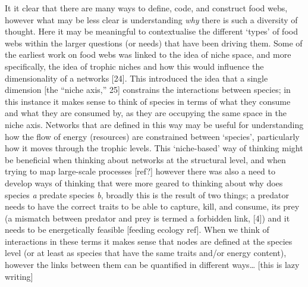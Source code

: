 \documentclass[
]{article}
\begin{document}
It it clear that there are many ways to define, code, and construct food
webs, however what may be less clear is understanding \emph{why} there
is such a diversity of thought. Here it may be meaningful to
contextualise the different `types' of food webs within the larger
questions (or needs) that have been driving them. Some of the earliest
work on food webs was linked to the idea of niche space, and more
specifically, the idea of trophic niches and how this would influence
the dimensionality of a networks {[}24{]}. This introduced the idea that
a single dimension {[}the ``niche axis,'' 25{]} constrains the
interactions between species; in this instance it makes sense to think
of species in terms of what they consume and what they are consumed by,
as they are occupying the same space in the niche axis. Networks that
are defined in this way may be useful for understanding how the flow of
energy (resources) are constrained between `species', particularly how
it moves through the trophic levels. This `niche-based' way of thinking
might be beneficial when thinking about networks at the structural
level, and when trying to map large-scale processes {[}ref?{]} however
there was also a need to develop ways of thinking that were more geared
to thinking about why does species \emph{a} predate species \emph{b},
broadly this is the result of two things; a predator needs to have the
correct traits to be able to capture, kill, and consume, its prey (a
mismatch between predator and prey is termed a forbidden link, {[}4{]})
and it needs to be energetically feasible {[}feeding ecology ref{]}.
When we think of interactions in these terms it makes sense that nodes
are defined at the species level (or at least as species that have the
same traits and/or energy content), however the links between them can
be quantified in different ways\ldots{} {[}this is lazy writing{]}
\end{document}
